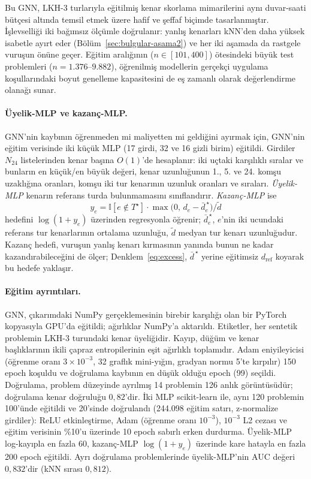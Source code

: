 \documentclass[pdflatex,sn-basic]{sn-jnl}
\begin{document}
Bu GNN, LKH-3 turlarıyla eğitilmiş kenar skorlama mimarilerini aynı duvar-saati bütçesi altında
temsil etmek üzere hafif ve şeffaf biçimde tasarlanmıştır. İşlevselliği iki bağımsız ölçümle
doğrulanır: yanlış kenarları kNN'den daha yüksek isabetle ayırt eder (Bölüm~\ref{sec:bulgular-asama2})
ve her iki aşamada da rastgele vuruşun önüne geçer.
Eğitim aralığının ($n\in[101,400]$) ötesindeki büyük test problemleri ($n=1.376$--$9.882$),
öğrenilmiş modellerin gerçekçi uygulama koşullarındaki boyut genelleme kapasitesini de eş zamanlı
olarak değerlendirme olanağı sunar.

\paragraph{Üyelik-MLP ve kazanç-MLP.} GNN'nin kaybının öğrenmeden mi maliyetten mi geldiğini
ayırmak için, GNN'nin eğitim verisinde iki küçük MLP (17 girdi, 32 ve 16 gizli birim) eğitildi.
Girdiler $N_{24}$ listelerinden kenar başına $O(1)$'de hesaplanır: iki uçtaki karşılıklı sıralar ve
bunların en küçük/en büyük değeri, kenar uzunluğunun 1., 5. ve 24. komşu uzaklığına oranları,
komşu iki tur kenarının uzunluk oranları ve sıraları. \emph{Üyelik-MLP} kenarın referans turda
bulunmamasını sınıflandırır. \emph{Kazanç-MLP} ise
\[
  y_e=\mathbb{I}[e\notin T^\star]\cdot\max\bigl(0,\,d_e-\bar d^{\,\star}_e\bigr)/\tilde d
\]
hedefini $\log(1+y_e)$ üzerinden regresyonla öğrenir; $\bar d^{\,\star}_e$, $e$'nin iki ucundaki
referans tur kenarlarının ortalama uzunluğu, $\tilde d$ medyan tur kenarı uzunluğudur. Kazanç
hedefi, vuruşun yanlış kenarı kırmasının yanında bunun ne kadar kazandırabileceğini de ölçer;
Denklem~\eqref{eq:excess}, $\bar d^{\,\star}$ yerine eğitimsiz $d_{\mathrm{ref}}$ koyarak bu hedefe
yaklaşır.

\paragraph{Eğitim ayrıntıları.} GNN, çıkarımdaki NumPy gerçeklemesinin birebir karşılığı olan bir
PyTorch kopyasıyla GPU'da eğitildi; ağırlıklar NumPy'a aktarıldı. Etiketler, her sentetik problemin
LKH-3 turundaki kenar üyeliğidir. Kayıp, düğüm ve kenar başlıklarının ikili çapraz entropilerinin
eşit ağırlıklı toplamıdır. Adam eniyileyicisi (öğrenme oranı $3\times10^{-3}$, 32 graflık
mini-yığın, gradyan normu 5'te kırpılır) 150 epoch koşuldu ve doğrulama kaybının en düşük olduğu
epoch (99) seçildi. Doğrulama, problem düzeyinde ayrılmış 14 problemin 126 anlık görüntüsüdür;
doğrulama kenar doğruluğu $0{,}82$'dir. İki MLP scikit-learn ile, aynı 120 problemin 100'ünde
eğitildi ve 20'sinde doğrulandı (244.098 eğitim satırı, z-normalize girdiler): ReLU etkinleştirme,
Adam (öğrenme oranı $10^{-3}$), $10^{-3}$ L2 cezası ve eğitim verisinin \%10'u üzerinde 10 epoch
sabırlı erken durdurma. Üyelik-MLP log-kayıpla en fazla 60, kazanç-MLP $\log(1+y_e)$ üzerinde kare
hatayla en fazla 200 epoch eğitildi. Ayrı doğrulama problemlerinde üyelik-MLP'nin AUC değeri
$0{,}832$'dir (kNN sırası $0{,}812$).
\end{document}
